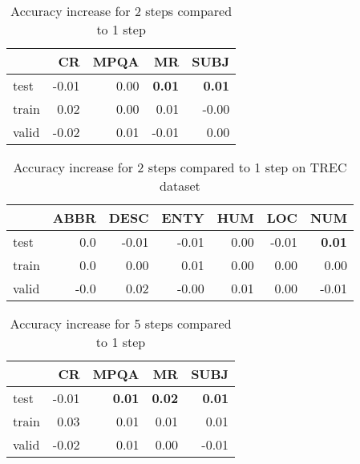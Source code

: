 


\begin{table}[H]
\begin{center}

\begin{tabular}{lrrrr}
\toprule
{} &  CR &  MPQA &  MR &  SUBJ \\
\midrule
test  &  -0.01 &   0.00 &   \textbf{0.01} &   \textbf{0.01} \\
train &   0.02 &   0.00 &   0.01 &    -0.00 \\
valid &  -0.02 &   0.01 &  -0.01 &   0.00 \\
\bottomrule
\end{tabular}

\caption[Accuracy increase for 2 steps compared to 1 step]{Accuracy increase for 2 steps compared to 1 step}
\label{tab:multiw:notrec:2}
\end{center}
\end{table}




\begin{table}[H]
\begin{center}

\begin{tabular}{lrrrrrr}
\toprule
{} &  ABBR &  DESC &  ENTY &  HUM &  LOC &  NUM \\
\midrule
test  &     0.0 &     -0.01 &     -0.01 &     0.00 &    -0.01 &     \textbf{0.01} \\
train &     0.0 &      0.00 &      0.01 &     0.00 &     0.00 &     0.00 \\
valid &      -0.0 &     0.02 &     -0.00 &     0.01 &     0.00 &    -0.01 \\
\bottomrule
\end{tabular}

\caption[Accuracy increase for 2 steps compared to 1 step on TREC dataset]{Accuracy increase for 2 steps compared to 1 step on TREC dataset}
\label{tab:multiw:trec:2}
\end{center}
\end{table}




\begin{table}[H]
\begin{center}

\begin{tabular}{lrrrr}
\toprule
{} &  CR &  MPQA &  MR &  SUBJ \\
\midrule
test  &  -0.01 &   \textbf{0.01} &   \textbf{0.02} &   \textbf{0.01} \\
train &   0.03 &   0.01 &   0.01 &   0.01 \\
valid &  -0.02 &   0.01 &   0.00 &    -0.01 \\
\bottomrule
\end{tabular}

\caption[Accuracy increase for 5 steps compared to 1 step]{Accuracy increase for 5 steps compared to 1 step}
\label{tab:multiw:notrec:5}
\end{center}
\end{table}




